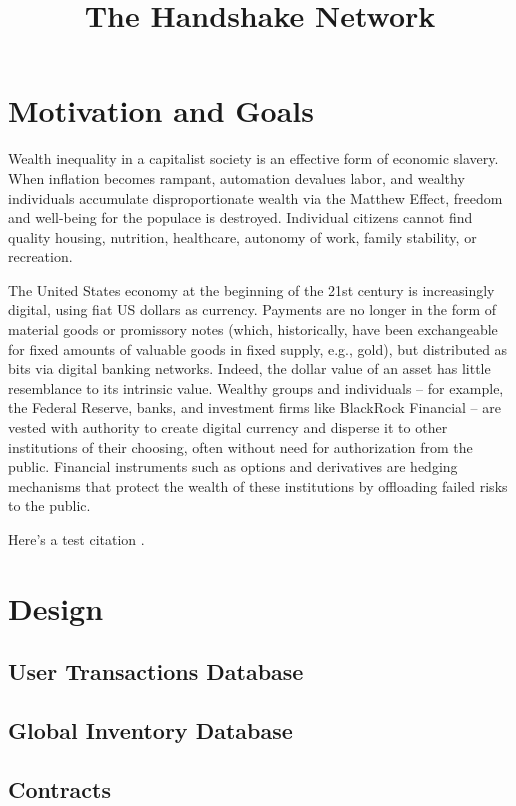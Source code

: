 \documentclass{article}
\begin{document}
	
\title{The Handshake Network}
	
\section{Motivation and Goals}

Wealth inequality in a capitalist society is an effective form of economic slavery. When
inflation becomes rampant, automation devalues labor, and wealthy individuals
accumulate disproportionate wealth via the Matthew Effect, freedom and well-being for the populace is
destroyed. Individual citizens cannot find quality housing, nutrition, healthcare, autonomy of
work, family stability, or recreation.

The United States economy at the beginning of the 21st century is increasingly digital, using
fiat US dollars as currency. Payments are no longer in the form of material goods or
promissory notes (which, historically, have been exchangeable for fixed amounts of valuable goods
in fixed supply, e.g., gold), but distributed as bits via digital banking networks. Indeed, the dollar
value of an asset has little resemblance to its intrinsic value. Wealthy groups and individuals -- for example,
the Federal Reserve, banks, and investment firms like BlackRock Financial -- are vested with authority to 
create digital currency and disperse it to other institutions of their choosing, often without
need for authorization from the public. Financial instruments such as options and derivatives are hedging mechanisms
that protect the wealth of these institutions by offloading failed risks to the public.



Here's a test citation \cite{sullivan2023}.

\section{Design}

\subsection{User Transactions Database}
\subsection{Global Inventory Database}

\subsection{Contracts}
\end{document}

